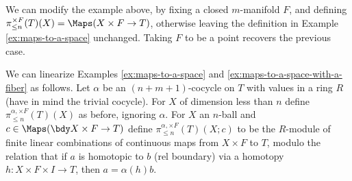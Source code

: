 \begin{example}
\rm
\label{ex:maps-to-a-space-with-a-fiber}%
We can modify the example above, by fixing a
closed $m$-manifold $F$, and defining $\pi^{\times F}_{\leq n}(T)(X) = \Maps(X \times F \to T)$, 
otherwise leaving the definition in Example \ref{ex:maps-to-a-space} unchanged.
Taking $F$ to be a point recovers the previous case.
\end{example}

\begin{example}
\rm
\label{ex:linearized-maps-to-a-space}%
We can linearize Examples \ref{ex:maps-to-a-space} and \ref{ex:maps-to-a-space-with-a-fiber} as follows.
Let $\alpha$ be an $(n{+}m{+}1)$-cocycle on $T$ with values in a ring $R$
(have in mind the trivial cocycle).
For $X$ of dimension less than $n$ define $\pi^{\alpha, \times F}_{\leq n}(T)(X)$ as before, ignoring $\alpha$.
For $X$ an $n$-ball and $c\in \Maps(\bdy X \times F \to T)$ define $\pi^{\alpha, \times F}_{\leq n}(T)(X; c)$ to be
the $R$-module of finite linear combinations of continuous maps from $X\times F$ to $T$,
modulo the relation that if $a$ is homotopic to $b$ (rel boundary) via a homotopy
$h: X\times F\times I \to T$, then $a = \alpha(h)b$.
\end{example}

